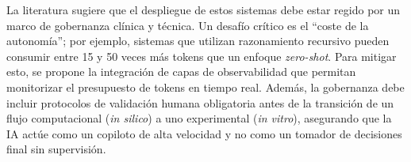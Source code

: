 La literatura sugiere que el despliegue de estos sistemas debe estar regido por
un marco de gobernanza clínica y técnica. Un desafío crítico es el ``coste de la
autonomía''; por ejemplo, sistemas que utilizan razonamiento recursivo pueden
consumir entre 15 y 50 veces más tokens que un enfoque \textit{zero-shot}. Para
mitigar esto, se propone la integración de capas de observabilidad que permitan
monitorizar el presupuesto de tokens en tiempo real. Además, la gobernanza debe
incluir protocolos de validación humana obligatoria antes de la transición de un
flujo computacional (\textit{in silico}) a uno experimental (\textit{in vitro}),
asegurando que la IA actúe como un copiloto de alta velocidad y no como un
tomador de decisiones final sin supervisión.
